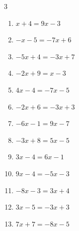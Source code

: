 \begin{multicols}{3}
\begin{enumerate}

  \item $x+4=9x-3$


  \item $-x-5=-7x+6$


  \item $-5x+4=-3x+7$


  \item $-2x+9=x-3$

        \phantom{$\displaystyle x=4$}

  \item $4x-4=-7x-5$


  \item $-2x+6=-3x+3$

        \phantom{$\displaystyle x=-3$}

  \item $-6x-1=9x-7$


  \item $-3x+8=5x-5$


  \item $3x-4=6x-1$

        \phantom{$\displaystyle x=-1$}

  \item $9x-4=-5x-3$


  \item $-8x-3=3x+4$


\columnbreak %

  \item $3x-5=-3x+3$


  \item $7x+7=-8x-5$



\end{enumerate}
\end{multicols}
